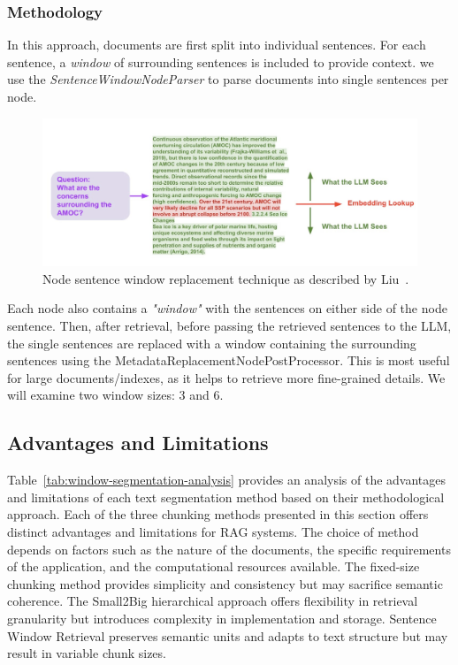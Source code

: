 \subsubsection{Methodology}
In this approach, documents are first split into individual sentences.
For each sentence, a \textit{window} of surrounding sentences is included to provide context.
we use the \textit{SentenceWindowNodeParser} to parse documents into single sentences per node.
\begin{figure}[ht!]
    \centering
    \begin{minipage}[b]{\textwidth}
        \centering
        \includegraphics[width=\textwidth]{res/window-ret}
        \caption{Node sentence window replacement technique as described by Liu~\cite{liu2023tweet}.}
        \label{fig:window-ret}
    \end{minipage}
\end{figure}
Each node also contains a \textit{"window"} with the sentences on either side of the node sentence.
Then, after retrieval, before passing the retrieved sentences to the LLM, the single sentences are replaced with a window containing the surrounding sentences using the MetadataReplacementNodePostProcessor.
This is most useful for large documents/indexes, as it helps to retrieve more fine-grained details.
We will examine two window sizes: 3 and 6.
\subsection{Advantages and Limitations}\label{subsec:advantages-and-limitations}
Table~\ref{tab:window-segmentation-analysis} provides an analysis of the advantages and limitations of each text segmentation method based on their methodological approach.
Each of the three chunking methods presented in this section offers distinct advantages and limitations for RAG systems.
The choice of method depends on factors such as the nature of the documents, the specific requirements of the application, and the computational resources available.
The fixed-size chunking method provides simplicity and consistency but may sacrifice semantic coherence.
The Small2Big hierarchical approach offers flexibility in retrieval granularity but introduces complexity in implementation and storage.
Sentence Window Retrieval preserves semantic units and adapts to text structure but may result in variable chunk sizes.

